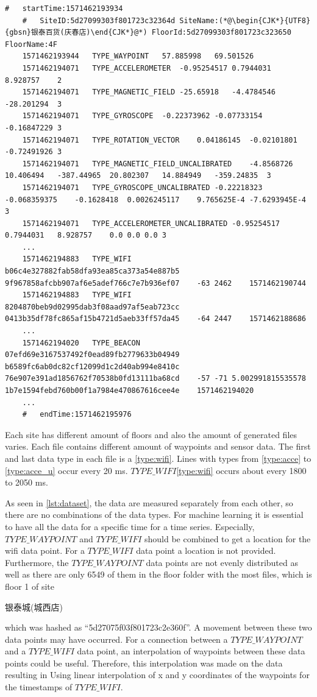 \begin{lstlisting}[caption={A snippet of a file from the dataset},label={lst:dataset}]
    #	startTime:1571462193934
    #	SiteID:5d27099303f801723c32364d	SiteName:(*@\begin{CJK*}{UTF8}{gbsn}银泰百货(庆春店)\end{CJK*}@*) FloorId:5d27099303f801723c323650	FloorName:4F
    1571462193944	TYPE_WAYPOINT	57.885998	69.501526
    1571462194071	TYPE_ACCELEROMETER	-0.95254517	0.7944031	8.928757	2
    1571462194071	TYPE_MAGNETIC_FIELD	-25.65918	-4.4784546	-28.201294	3
    1571462194071	TYPE_GYROSCOPE	-0.22373962	-0.07733154	-0.16847229	3
    1571462194071	TYPE_ROTATION_VECTOR	0.04186145	-0.02101801	-0.72491926	3
    1571462194071	TYPE_MAGNETIC_FIELD_UNCALIBRATED	-4.8568726	10.406494	-387.44965	20.802307	14.884949	-359.24835	3
    1571462194071	TYPE_GYROSCOPE_UNCALIBRATED	-0.22218323	-0.068359375	-0.1628418	0.0026245117	9.765625E-4	-7.6293945E-4	3
    1571462194071	TYPE_ACCELEROMETER_UNCALIBRATED	-0.95254517	0.7944031	8.928757	0.0	0.0	0.0	3
    ...
    1571462194883	TYPE_WIFI	b06c4e327882fab58dfa93ea85ca373a54e887b5	9f967858afcbb907af6e5adef766c7e7b936ef07	-63	2462	1571462190744
    1571462194883	TYPE_WIFI	8204870beb9d02995dab3f08aad97af5eab723cc	0413b35df78fc865af15b4721d5aeb33ff57da45	-64	2447	1571462188686
    ...
    1571462194020	TYPE_BEACON	07efd69e3167537492f0ead89fb2779633b04949	b6589fc6ab0dc82cf12099d1c2d40ab994e8410c	76e907e391ad1856762f70538b0fd13111ba68cd	-57	-71	5.002991815535578	1b7e1594febd760b00f1a7984e470867616cee4e	1571462194020
    ...
    #	endTime:1571462195976
\end{lstlisting}

Each site has different amount of floors and also the amount of generated files varies.
Each file contains different amount of waypoints and sensor data.
The first and last data type in each file is a \ref{type:wifi}.
Lines with types from \ref{type:acce} to \ref{type:acce_u} occur every 20 ms.
\(TYPE\_WIFI\)\ref{type:wifi} occurs about every 1800 to 2050 ms.

As seen in \autoref{lst:dataset}, the data are measured separately from each other, so there are no combinations of the data types.
For machine learning it is essential to have all the data for a specific time for a time series.
Especially, \(TYPE\_WAYPOINT\) and \(TYPE\_WIFI\) should be combined to get a location for the \ac{wifi} data point.
For a \(TYPE\_WIFI\) data point a location is not provided.
Furthermore, the \(TYPE\_WAYPOINT\) data points are not evenly distributed as well as there are only 6549 of them in the floor folder with the most files, which is floor 1 of site \begin{CJK*}{UTF8}{gbsn}银泰城(城西店)\end{CJK*} which was hashed as ``5d27075f03f801723c2e360f''.
A movement between these two data points may have occurred.
For a connection between a \(TYPE\_WAYPOINT\) and a \(TYPE\_WIFI\) data point, an interpolation of waypoints between these data points could be useful.
Therefore, this interpolation was made on the data resulting in 
Using linear interpolation of x and y coordinates of the waypoints for the timestamps of \(TYPE\_WIFI\).

